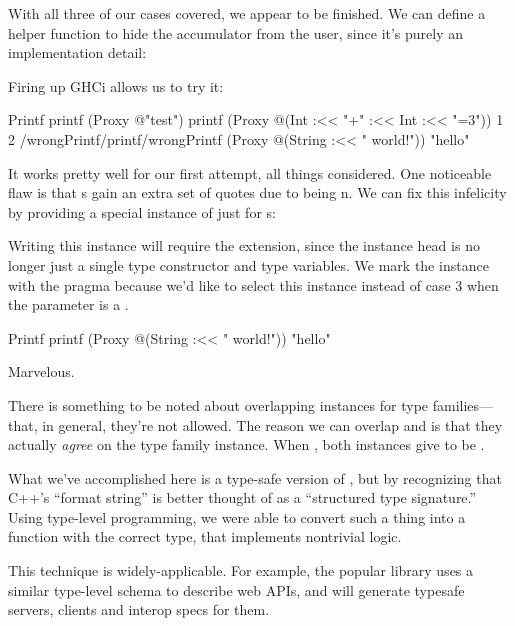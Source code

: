 \documentclass[book.tex]{subfiles}
\begin{document}
With all three of our cases covered, we appear to be finished. We can define a
helper function to hide the accumulator from the user, since it's purely an
implementation detail:


Firing up GHCi allows us to try it:

\begin{dorepl}{Printf}
printf (Proxy @"test")
printf (Proxy @(Int :<< "+" :<< Int :<< "=3")) 1 2
/wrongPrintf/printf/wrongPrintf (Proxy @(String :<< " world!")) "hello"
\end{dorepl}

It works pretty well for our first attempt, all things considered. One
noticeable flaw is that s gain an extra set of quotes due to being
n. We can fix this infelicity by providing a special instance of
 just for s:


Writing this instance will require the  extension,
since the instance head is no longer just a single type constructor and type
variables. We mark the instance with the  pragma
because we'd like to select this instance instead of case 3 when the parameter
is a .

\begin{dorepl}{Printf}
printf (Proxy @(String :<< " world!")) "hello"
\end{dorepl}

Marvelous.

There is something to be noted about overlapping instances for type
families---that, in general, they're not allowed. The reason we can overlap
 and  is that they actually \emph{agree} on the
type family instance. When , both instances give
 to be .

What we've accomplished here is a type-safe version of , but by
recognizing that C++'s ``format string'' is better thought of as a ``structured
type signature.'' Using type-level programming, we were able to convert such a
thing into a function with the correct type, that implements nontrivial logic.

This technique is widely-applicable. For example, the popular
\cite{servant} library uses a similar type-level schema to describe
web APIs, and will generate typesafe servers, clients and interop specs for
them.
\end{document}

